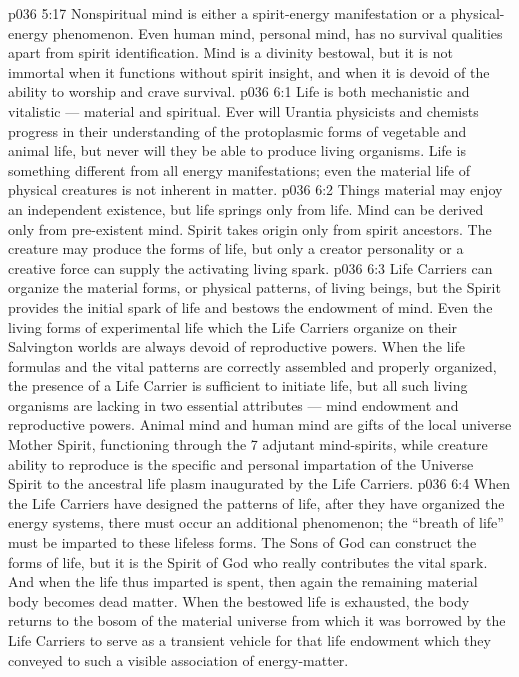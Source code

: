\vs p036 5:17 \pc Nonspiritual mind is either a spirit\hyp{}energy manifestation or a physical\hyp{}energy phenomenon. Even human mind, personal mind, has no survival qualities apart from spirit identification. Mind is a divinity bestowal, but it is not immortal when it functions without spirit insight, and when it is devoid of the ability to worship and crave survival.
\vs p036 6:1 Life is both mechanistic and vitalistic --- material and spiritual. Ever will Urantia physicists and chemists progress in their understanding of the protoplasmic forms of vegetable and animal life, but never will they be able to produce living organisms. Life is something different from all energy manifestations; even the material life of physical creatures is not inherent in matter.
\vs p036 6:2 Things material may enjoy an independent existence, but life springs only from life. Mind can be derived only from pre\hyp{}existent mind. Spirit takes origin only from spirit ancestors. The creature may produce the forms of life, but only a creator personality or a creative force can supply the activating living spark.
\vs p036 6:3 Life Carriers can organize the material forms, or physical patterns, of living beings, but the Spirit provides the initial spark of life and bestows the endowment of mind. Even the living forms of experimental life which the Life Carriers organize on their Salvington worlds are always devoid of reproductive powers. When the life formulas and the vital patterns are correctly assembled and properly organized, the presence of a Life Carrier is sufficient to initiate life, but all such living organisms are lacking in two essential attributes --- mind endowment and reproductive powers. Animal mind and human mind are gifts of the local universe Mother Spirit, functioning through the 7 adjutant mind\hyp{}spirits, while creature ability to reproduce is the specific and personal impartation of the Universe Spirit to the ancestral life plasm inaugurated by the Life Carriers.
\vs p036 6:4 \pc When the Life Carriers have designed the patterns of life, after they have organized the energy systems, there must occur an additional phenomenon; the “breath of life” must be imparted to these lifeless forms. The Sons of God can construct the forms of life, but it is the Spirit of God who really contributes the vital spark. And when the life thus imparted is spent, then again the remaining material body becomes dead matter. When the bestowed life is exhausted, the body returns to the bosom of the material universe from which it was borrowed by the Life Carriers to serve as a transient vehicle for that life endowment which they conveyed to such a visible association of energy\hyp{}matter.
